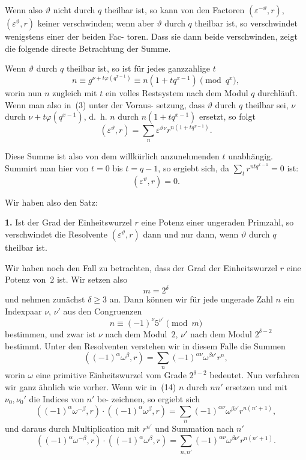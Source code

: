 \documentclass[12pt,a4paper]{article}
\theoremstyle{plain}
\theoremstyle{definition}
\theoremstyle{remark}
\begin{document}
Wenn also $\vartheta$ nicht durch $q$ theilbar ist, so kann von den
Factoren $(\varepsilon^{-\vartheta}, r)$, $(\varepsilon^\vartheta, r)$ keiner verschwinden; wenn aber $\vartheta$ durch
$q$ theilbar ist, so verschwindet wenigstens einer der beiden Fac-
toren. Dass sie dann beide verschwinden, zeigt die folgende
directe Betrachtung der Summe.

Wenn $\vartheta$ durch $q$ theilbar ist, so ist für jedes ganzzahlige $t$
\[
n \equiv g^{\nu + t \varphi(q^{x-1})} \equiv n(1 + tq^{x-1}) \pmod{q^x},
\]
worin nun $n$ zugleich mit $t$ ein volles Restsystem nach dem
Modul $q$ durchläuft. Wenn man also in~(3) unter der Voraus-
setzung, dass $\vartheta$ durch $q$ theilbar sei, $\nu$ durch $\nu + t\varphi(q^{x-1})$, d.~h.
$n$ durch $n(1+tq^{x-1})$ ersetzt, so folgt
\[
(\varepsilon^\vartheta, r) = \sum_n \varepsilon^{\vartheta \nu} r^{n(1+tq^{x-1})}.
\]

Diese Summe ist also von dem willkürlich anzunehmenden $t$
unabhängig. Summirt man hier von $t = 0$ bis $t = q-1$, so
ergiebt sich, da $\sum_t r^{ntq^{x-1}} = 0$ ist:
\begin{equation}\tag{13}
(\varepsilon^\vartheta, r) = 0.
\end{equation}

Wir haben also den Satz:

\textbf{1.} Ist der Grad der Einheitswurzel $r$ eine Potenz
einer ungeraden Primzahl, so verschwindet die
Resolvente $(\varepsilon^\vartheta, r)$ dann und nur dann, wenn $\vartheta$
durch $q$ theilbar ist.

Wir haben noch den Fall zu betrachten, dass der Grad der
Einheitswurzel $r$ eine Potenz von~$2$ ist. Wir setzen also
\[
m = 2^\delta
\]
und nehmen zunächst $\delta \geq 3$ an. Dann können wir für jede
ungerade Zahl $n$ ein Indexpaar $\nu$, $\nu'$ aus den Congruenzen
\[
n \equiv (-1)^\nu 5^{\nu'} \pmod{m}
\]
bestimmen, und zwar ist $\nu$ nach dem Modul~$2$, $\nu'$ nach dem
Modul $2^{\delta-2}$ bestimmt. Unter den Resolventen verstehen wir in
diesem Falle die Summen
\begin{equation}\tag{14}
((-1)^\alpha \omega^\beta, r) = \sum_n (-1)^{\alpha \nu} \omega^{\beta \nu'} r^n,
\end{equation}
worin $\omega$ eine primitive Einheitswurzel vom Grade $2^{\delta-2}$ bedeutet.
Nun verfahren wir ganz ähnlich wie vorher. Wenn wir in~(14)
$n$ durch $nn'$ ersetzen und mit $\nu_0, \nu_0'$ die Indices von $n'$ be-
zeichnen, so ergiebt sich
\begin{equation}\tag{15}
((-1)^\alpha \omega^{-\beta}, r) \cdot ((-1)^\alpha \omega^\beta, r) = \sum_n (-1)^{\alpha \nu} \omega^{\beta \nu'} r^{n(n'+1)},
\end{equation}
und daraus durch Multiplication mit $r^{n'}$ und Summation nach $n'$
\begin{equation}\tag{16}
((-1)^\alpha \omega^{-\beta}, r) \cdot ((-1)^\alpha \omega^\beta, r) = \sum_{n,n'} (-1)^{\alpha \nu} \omega^{\beta \nu'} r^{n(n'+1)}.
\end{equation}
\end{document}
